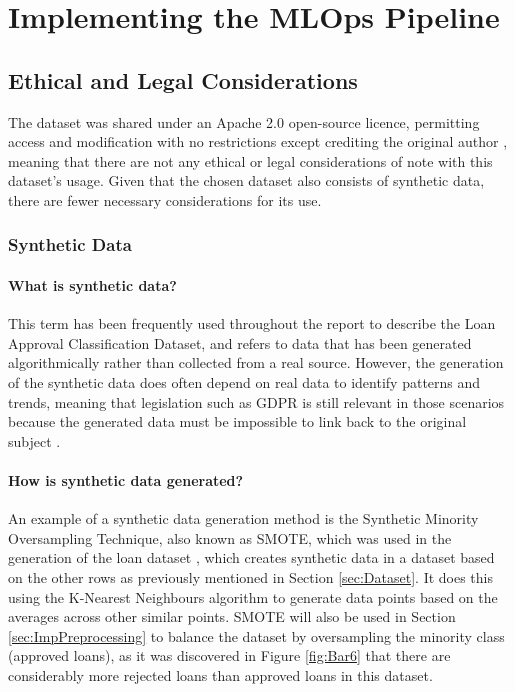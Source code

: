 \documentclass[12pt]{report}
\begin{document}




\chapter{Implementing the MLOps Pipeline}
\section{Ethical and Legal Considerations}
The dataset was shared under an Apache 2.0 open-source licence, permitting access and modification with no restrictions
except crediting the original author \autocite{apache_apache_nodate}, meaning that there are not any ethical or legal 
considerations of note with this dataset's usage. Given that the chosen dataset also consists of synthetic data,
there are fewer necessary considerations for its use.

\subsection{Synthetic Data}
\subsubsection{What is synthetic data?}
This term has been frequently used throughout the report to describe the Loan Approval Classification Dataset, and refers to 
data that has been generated algorithmically rather than collected from a real source. However, the generation of the 
synthetic data does often depend on real data to identify patterns and trends, meaning that legislation such as GDPR is still relevant
in those scenarios because the generated data must be impossible to link back to the original subject \autocite{Lopez2022OnTL}.

\subsubsection{How is synthetic data generated?}
An example of a synthetic data generation method is the Synthetic Minority Oversampling Technique, also known as SMOTE, which was used
in the generation of the loan dataset \autocite{zoppelleto_financial_nodate}, which creates synthetic data in a dataset based on the
other rows as previously mentioned in Section \ref{sec:Dataset}. It does this using the K-Nearest Neighbours algorithm to generate 
data points based on the averages across other similar points. SMOTE will also be used in Section \ref{sec:ImpPreprocessing} to balance
the dataset by oversampling the minority class (approved loans), as it was discovered in Figure \ref{fig:Bar6} that there are considerably 
more rejected loans than approved loans in this dataset.
\end{document}
